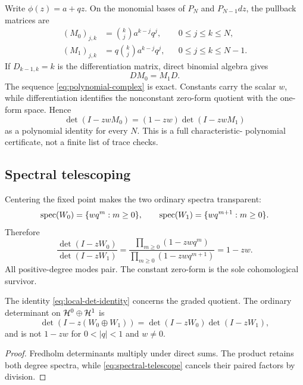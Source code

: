 Write \(\phi(z)=a+qz\).  On the monomial bases of \(P_N\) and
\(P_{N-1}dz\), the pullback matrices are
\begin{align}
 (M_0)_{j,k}
 &=\binom{k}{j}a^{k-j}q^j,
 &&0\le j\le k\le N,
 \label{eq:M0}\\
 (M_1)_{j,k}
 &=q\binom{k}{j}a^{k-j}q^j,
 &&0\le j\le k\le N-1.
 \label{eq:M1}
\end{align}
If \(D_{k-1,k}=k\) is the differentiation matrix, direct binomial algebra
gives
\[
        DM_0=M_1D.
\]
The sequence \eqref{eq:polynomial-complex} is exact.  Constants carry the
scalar \(w\), while differentiation identifies the nonconstant zero-form
quotient with the one-form space.  Hence
\begin{equation}
 \det(I-zwM_0)=(1-zw)\det(I-zwM_1)
 \label{eq:finite-characteristic}
\end{equation}
as a polynomial identity for every \(N\).  This is a full characteristic-
polynomial certificate, not a finite list of trace checks.

\subsection{Spectral telescoping}

Centering the fixed point makes the two ordinary spectra transparent:
\[
 \operatorname{spec}(W_0)=\{wq^m:m\ge0\},\qquad
 \operatorname{spec}(W_1)=\{wq^{m+1}:m\ge0\}.
\]
Therefore
\begin{equation}
 \frac{\det(I-zW_0)}{\det(I-zW_1)}
 =\frac{\prod_{m\ge0}(1-zwq^m)}
        {\prod_{m\ge0}(1-zwq^{m+1})}
 =1-zw.
 \label{eq:spectral-telescope}
\end{equation}
All positive-degree modes pair.  The constant zero-form is the sole
cohomological survivor.

\begin{proposition}
\label{prop:ordinary-graded}
The identity \eqref{eq:local-det-identity} concerns the graded quotient.
The ordinary determinant on \(\mathcal H^0\oplus\mathcal H^1\) is
\[
 \det(I-z(W_0\oplus W_1))
 =\det(I-zW_0)\det(I-zW_1),
\]
and is not \(1-zw\) for \(0<|q|<1\) and \(w\ne0\).
\end{proposition}

\begin{proof}
Fredholm determinants multiply under direct sums.  The product retains both
degree spectra, while \eqref{eq:spectral-telescope} cancels their paired
factors by division.
\end{proof}

